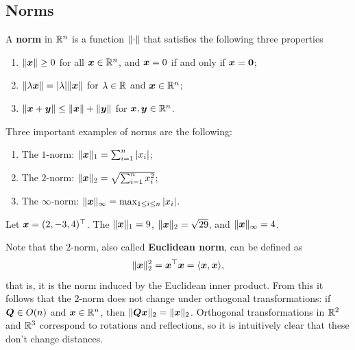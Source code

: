 \documentclass[11pt,a4paper]{memoir}
\begin{document}
\subsection{Norms}
A \textbf{norm} in $\mathbb{R}^n$ is a function $\Vert {\cdot}\Vert$ that satisfies the following three properties
\begin{enumerate}
 \item $\Vert {\bm{x}}\Vert\geq 0$ for all $\bm{x}\in \mathbb{R}^n$, and $\bm{x}=0$ if and only if $\bm{x}=\bm{0}$;
 \item $\Vert {\lambda \bm{x}}\Vert = |\lambda|\Vert {\bm{x}}\Vert$ for $\lambda\in \mathbb{R}$ and $\bm{x}\in \mathbb{R}^n$;
 \item $\Vert {\bm{x}+\bm{y}}\Vert\leq \Vert {\bm{x}}\Vert+\Vert {\bm{y}}\Vert$ for $\bm{x},\bm{y}\in \mathbb{R}^n$.
\end{enumerate}
Three important examples of norms are the following:
\begin{enumerate}
 \item The $1$-norm: $\Vert {\bm{x}}\Vert_1 = \sum_{i=1}^n |x_i|$;
 \item The $2$-norm: $\Vert {\bm{x}}\Vert_2 = \sqrt{\sum_{i=1}^n x_i^2}$;
 \item The $\infty$-norm: $\Vert {\bm{x}}\Vert_\infty = \max_{1\leq i\leq n} |x_i|$.
\end{enumerate}

\begin{example}
Let $\bm{x}=(2,-3,4)^{\top}$. The $\Vert {\bm{x}}\Vert_1=9$, $\Vert {\bm{x}}\Vert_2=\sqrt{29}$, and $\Vert {\bm{x}}\Vert_{\infty} = 4$. 
\end{example}

Note that the $2$-norm, also called \textbf{Euclidean norm}, can be defined as
\begin{equation*}
 \Vert {\bm{x}}\Vert_2^2 = \bm{x}^{\top}\bm{x} = \langle {\bm{x}}, {\bm{x}} \rangle,
\end{equation*}
that is, it is the norm induced by the Euclidean inner product. From this it follows that the $2$-norm does not change under orthogonal transformations: if $\bm{Q}\in O(n)$ and $\bm{x}\in \mathbb{R}^n$, then $\Vert {\bm{Q}\bm{x}}\Vert_2 = \Vert {\bm{x}}\Vert_2$. Orthogonal transformations in $\mathbb{R}^2$ and $\mathbb{R}^3$ correspond to rotations and reflections, so it is intuitively clear that these don't change distances.
\end{document}
